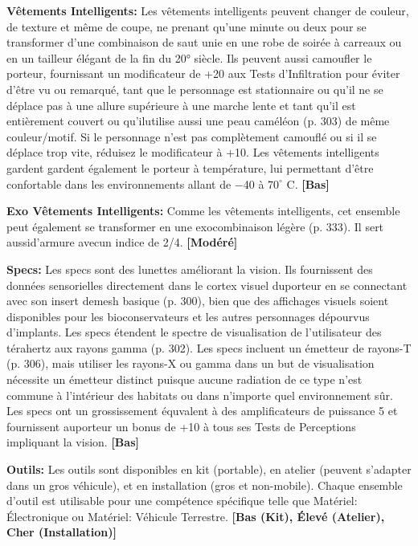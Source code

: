 \textbf{Vêtements Intelligents:} Les vêtements intelligents peuvent changer de couleur, de texture et même de coupe, ne prenant qu'une minute ou deux pour se transformer d'une combinaison de saut unie en une robe de soirée à carreaux ou en un tailleur élégant de la fin du 20° siècle. Ils peuvent aussi camoufler le porteur, fournissant un modificateur de +20 aux Tests d'Infiltration pour éviter d'être vu ou remarqué, tant que le personnage est stationnaire ou qu'il ne se déplace pas à une allure supérieure à une marche lente et tant qu'il est entièrement couvert ou qu'ilutilise aussi une peau caméléon (p. 303) de même couleur/motif. Si le personnage n'est pas complètement camouflé ou si il se déplace trop vite, réduisez le modificateur à +10. Les vêtements intelligents gardent gardent également le porteur à température, lui permettant d'être confortable dans les environnements allant de $-$40 à $70^{\circ}$ C. \textbf{[Bas]} 

\textbf{Exo Vêtements Intelligents:} Comme les vêtements intelligents, cet ensemble peut également se transformer en une exocombinaison légère (p. 333). Il sert aussid'armure avecun indice de 2/4. \textbf{[Modéré]} 

\textbf{Specs:} Les specs sont des lunettes améliorant la vision. Ils fournissent des données sensorielles directement dans le cortex visuel duporteur en se connectant avec son insert demesh basique (p. 300), bien que des affichages visuels soient disponibles pour les bioconservateurs et les autres personnages dépourvus d'implants. Les specs étendent le spectre de visualisation de l'utilisateur des térahertz aux rayons gamma (p. 302). Les specs incluent un émetteur de rayons-T (p. 306), mais utiliser les rayons-X ou gamma dans un but de visualisation nécessite un émetteur distinct puisque aucune radiation de ce type n'est commune à l'intérieur des habitats ou dans n'importe quel environnement sûr. Les specs ont un grossissement équvalent à des amplificateurs de puissance 5 et fournissent auporteur un bonus de +10 à tous ses Tests de Perceptions impliquant la vision. \textbf{[Bas]} 

\textbf{Outils:} Les outils sont disponibles en kit (portable), en atelier (peuvent s'adapter dans un gros véhicule), et en installation (gros et non-mobile). Chaque ensemble d'outil est utilisable pour une compétence spécifique telle que Matériel: Électronique ou Matériel: Véhicule Terrestre. \textbf{[Bas (Kit), Élevé (Atelier), Cher (Installation)]} 

